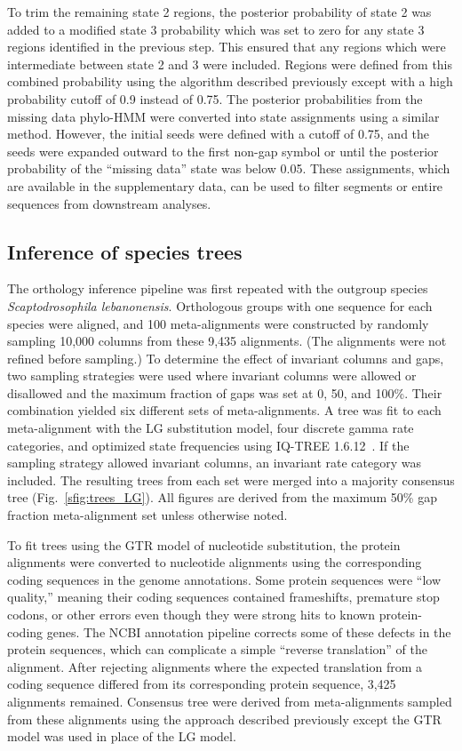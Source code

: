 To trim the remaining state 2 regions, the posterior probability of state 2 was added to a modified state 3 probability which was set to zero for any state 3 regions identified in the previous step. This ensured that any regions which were intermediate between state 2 and 3 were included. Regions were defined from this combined probability using the algorithm described previously except with a high probability cutoff of 0.9 instead of 0.75. The posterior probabilities from the missing data phylo-HMM were converted into state assignments using a similar method. However, the initial seeds were defined with a cutoff of 0.75, and the seeds were expanded outward to the first non-gap symbol or until the posterior probability of the ``missing data'' state was below 0.05. These assignments, which are available in the supplementary data, can be used to filter segments or entire sequences from downstream analyses.

\subsection{Inference of species trees}
The orthology inference pipeline was first repeated with the outgroup species \textit{Scaptodrosophila lebanonensis}. Orthologous groups with one sequence for each species were aligned, and 100 meta-alignments were constructed by randomly sampling 10,000 columns from these 9,435 alignments. (The alignments were not refined before sampling.) To determine the effect of invariant columns and gaps, two sampling strategies were used where invariant columns were allowed or disallowed and the maximum fraction of gaps was set at 0, 50, and 100\%. Their combination yielded six different sets of meta-alignments. A tree was fit to each meta-alignment with the LG substitution model, four discrete gamma rate categories, and optimized state frequencies using IQ-TREE 1.6.12~\cite{Nguyen2014, Le2008, Yang1994}. If the sampling strategy allowed invariant columns, an invariant rate category was included. The resulting trees from each set were merged into a majority consensus tree (Fig.~\ref{sfig:trees_LG}). All figures are derived from the maximum 50\% gap fraction meta-alignment set unless otherwise noted.

To fit trees using the GTR model of nucleotide substitution, the protein alignments were converted to nucleotide alignments using the corresponding coding sequences in the genome annotations. Some protein sequences were ``low quality,'' meaning their coding sequences contained frameshifts, premature stop codons, or other errors even though they were strong hits to known protein-coding genes. The NCBI annotation pipeline corrects some of these defects in the protein sequences, which can complicate a simple ``reverse translation'' of the alignment. After rejecting alignments where the expected translation from a coding sequence differed from its corresponding protein sequence, 3,425 alignments remained. Consensus tree were derived from meta-alignments sampled from these alignments using the approach described previously except the GTR model was used in place of the LG model.

